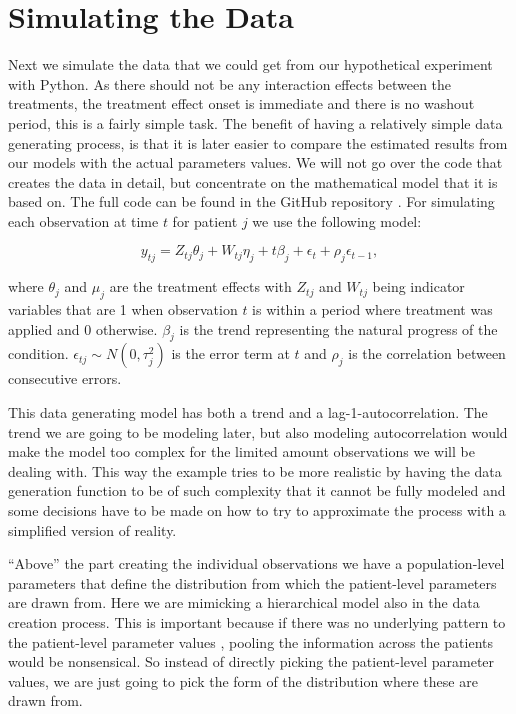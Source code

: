 \documentclass[12pt,a4paper,leqno]{report}
\theoremstyle{plain}
\theoremstyle{definition}
\theoremstyle{remark}
\begin{document}
\section{Simulating the Data}

Next we simulate the data that we could get from our hypothetical experiment with Python.
As there should not be any interaction effects between the treatments, the treatment
effect onset is immediate and there is no washout period, this is a fairly simple
task. The benefit of having a relatively simple data generating process, is that it is
later easier to compare the estimated results from our models with the actual parameters
values. We will not go over the code that creates the data in detail, but concentrate on
the mathematical model that it is based on. The full code can be found in the GitHub repository
\cite{github}. For simulating each observation at time \(t\) for patient \(j\) we use the following model:

\begin{def}\label{simulationmodel}
    \begin{equation}\label{}
        y_{tj} = Z_{tj}\theta_{j} + W_{tj}\eta_{j} + t\beta_j + \epsilon_t + \rho_j\epsilon_{t-1},
    \end{equation}
\end{def}where \(\theta_j\) and \(\mu_j\) are the treatment effects with \(Z_{tj}\) and \(W_{tj}\) being indicator
variables that are 1 when observation \(t\) is within a period where treatment was applied and
0 otherwise. \(\beta_j\) is the trend representing the natural progress of the
condition. \(\epsilon_{tj} \sim N(0,\tau_j^2) \) is the error term at \(t\) and
\(\rho_j\) is the correlation between consecutive errors.

This data generating model has both a trend and a lag-1-autocorrelation. The trend we
are going to be modeling later, but also modeling autocorrelation would make the model
too complex for the limited amount observations we will be dealing with. This way the example tries to be more realistic
by having the data generation function to be of such complexity that it cannot be
fully modeled and some decisions have to be made on how to try to approximate
the process with a simplified version of reality.

``Above'' the part creating the individual observations we have a population-level parameters
that define the distribution from which the patient-level parameters are drawn from.
Here we are mimicking a hierarchical model also in the data creation process. This is
important because if there was no underlying pattern to the patient-level parameter values
, pooling the information across the patients
would be nonsensical. So instead of directly picking the patient-level parameter values,
we are just going to pick the form of the distribution where these are drawn from.
\end{document}
